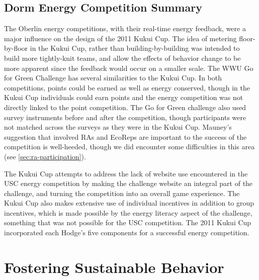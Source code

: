 \subsection{Dorm Energy Competition Summary}

The Oberlin energy competitions, with their real-time energy feedback, were a major influence on the design of the 2011 Kukui Cup. The idea of metering floor-by-floor in the Kukui Cup, rather than building-by-building was intended to build more tightly-knit teams, and allow the effects of behavior change to be more apparent since the feedback would occur on a smaller scale. The WWU Go for Green Challenge has several similarities to the Kukui Cup. In both competitions, points could be earned as well as energy conserved, though in the Kukui Cup individuals could earn points and the energy competition was not directly linked to the point competition. The Go for Green challenge also used survey instruments before and after the competition, though participants were not matched across the surveys as they were in the Kukui Cup. Mauney's suggestion that involved RAs and EcoReps are important to the success of the competition is well-heeded, though we did encounter some difficulties in this area (see \autoref{sec:ra-participation}).

The Kukui Cup attempts to address the lack of website use encountered in the USC energy competition by making the challenge website an integral part of the challenge, and turning the competition into an overall game experience. The Kukui Cup also makes extensive use of individual incentives in addition to group incentives, which is made possible by the energy literacy aspect of the challenge, something that was not possible for the USC competition. The 2011 Kukui Cup incorporated each Hodge's five components for a successful energy competition.


\section{Fostering Sustainable Behavior}
\label{sec:fostering-behavior}

